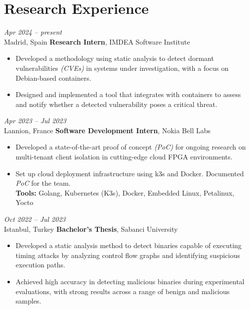 \section{Research Experience}

\begin{twocolentry}{
    \textit{Apr 2024 – present}\\
    \small Madrid, Spain}
    \normalsize \textbf{Research Intern}, \small {IMDEA Software Institute}
    \small  
    \begin{itemize}
        \item Developed a methodology using static analysis to detect dormant vulnerabilities \textit{(CVEs)} in systems under investigation, with a focus on Debian-based containers.
        \item Designed and implemented a tool that integrates with containers to assess and notify whether a detected vulnerability poses a critical threat.
      \end{itemize}
\end{twocolentry}

\vspace{\betweenentryspace}
\begin{twocolentry}{
    \textit{Apr 2023 – Jul 2023}\\
    \small Lannion, France}
    \normalsize \textbf{Software Development Intern}, \small {Nokia Bell Labs}
    \small  
    \begin{itemize}
        \item Developed a state-of-the-art proof of concept \textit{(PoC)} for ongoing research on multi-tenant client isolation in cutting-edge cloud FPGA environments.
        \item Set up cloud deployment infrastructure using k3s and Docker. Documented \textit{PoC} for the team. \\
        \footnotesize \textbf{Tools:} Golang, Kubernetes (K3s), Docker, Embedded Linux, Petalinux, Yocto
    \end{itemize}
\end{twocolentry}



\vspace{\betweenentryspace}

\begin{twocolentry}{
    \textit{Oct 2022 – Jul 2023}\\
    \small Istanbul, Turkey}
    \normalsize \textbf{Bachelor's Thesis}, \small {Sabanci University}
    \small  
    \begin{itemize}
        \item Developed a static analysis method to detect binaries capable of executing timing attacks by analyzing control flow graphs and identifying suspicious execution paths.
        \item Achieved high accuracy in detecting malicious binaries during experimental evaluations, with strong results across a range of benign and malicious samples.
    
        \end{itemize}
\end{twocolentry}

